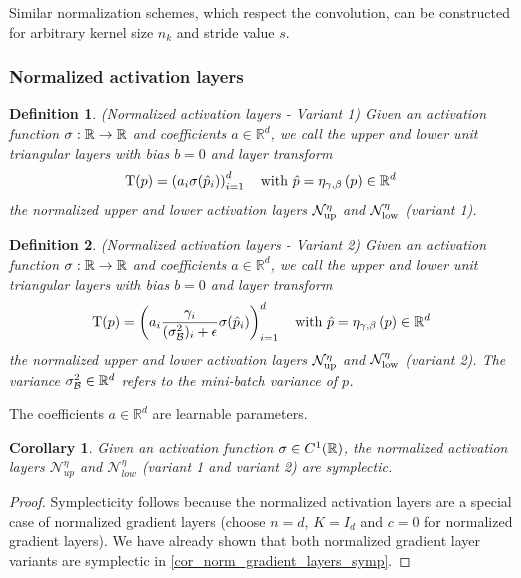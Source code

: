 \documentclass[twoside,a4paper]{article}
\newtheorem{definition}{Definition}
\newtheorem{corollary}{Corollary}
\begin{document}
Similar normalization schemes, which respect the convolution, can be constructed for arbitrary 
kernel size $n_k$ and stride value $s$.

\subsubsection{Normalized activation layers}

\begin{definition}\label{def_norm_activation_layer_1}
	(Normalized activation layers - Variant 1)
	Given an activation function $\sigma : \mathbb{R} \to \mathbb{R}$ and coefficients $a \in \mathbb{R}^d$, 
	we call the upper and lower unit triangular layers with bias $b=0$ and layer transform
	\begin{equation*}
		\mathrm{T}(p) = \left( a_i \sigma(\hat{p}_i) \right)_{i=1}^d
		\quad \text{with } \hat{p} = \eta_{\gamma, \beta} \left( p \right) \in \mathbb{R}^d
	\end{equation*}
	the normalized upper and lower activation layers $\mathcal{N}_{\text{up}}^\eta$ and $\mathcal{N}_{\text{low}}^\eta$
	(variant 1).
\end{definition}

\begin{definition}\label{def_norm_activation_layer_2}
	(Normalized activation layers - Variant 2)
	Given an activation function $\sigma : \mathbb{R} \to \mathbb{R}$ and coefficients $a \in \mathbb{R}^d$, 
	we call the upper and lower unit triangular layers with bias $b=0$ and layer transform
	\begin{equation*}
		\mathrm{T}(p) = \left( a_i \frac{\gamma_i}{(\sigma^2_\mathcal{B})_i + \epsilon} 
		\sigma(\hat{p}_i) \right)_{i=1}^d
		\quad \text{with } \hat{p} = \eta_{\gamma, \beta} \left( p \right) \in \mathbb{R}^d
	\end{equation*}
	the normalized upper and lower activation layers $\mathcal{N}_{\text{up}}^\eta$ and $\mathcal{N}_{\text{low}}^\eta$
	(variant 2).
	The variance $\sigma^2_\mathcal{B} \in \mathbb{R}^d$ refers to the mini-batch variance of $p$.
\end{definition}

The coefficients $a \in \mathbb{R}^d$ are learnable parameters.

\begin{corollary}
	Given an activation function $\sigma \in C^1(\mathbb{R})$,
	the normalized activation layers $\mathcal{N}^{\eta}_{up}$ and $\mathcal{N}^{\eta}_{low}$
	(variant 1 and variant 2) are symplectic.
\end{corollary}
\begin{proof}
	Symplecticity follows because the normalized activation layers are a special case
	of normalized gradient layers (choose $n=d$, $K=I_d$ and $c=0$ for normalized gradient layers). 
	We have already shown that both normalized gradient layer variants are symplectic in
	\cref{cor_norm_gradient_layers_symp}.
\end{proof}
\end{document}
